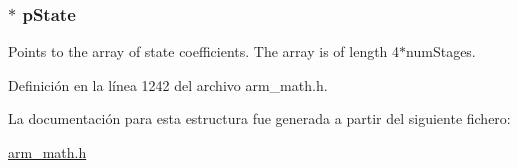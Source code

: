 \subsubsection[{\texorpdfstring{p\+State}{pState}}]{$\ast$ p\+State}\hypertarget{structarm__biquad__casd__df1__inst__q15_ae29dfdb736374fcddaeaec4b7770170c}{}\label{structarm__biquad__casd__df1__inst__q15_ae29dfdb736374fcddaeaec4b7770170c}
Points to the array of state coefficients. The array is of length 4$\ast$num\+Stages. 

Definición en la línea 1242 del archivo arm\+\_\+math.\+h.



La documentación para esta estructura fue generada a partir del siguiente fichero\+:\begin{DoxyCompactItemize}
\item 
\hyperlink{arm__math_8h}{arm\+\_\+math.\+h}\end{DoxyCompactItemize}
